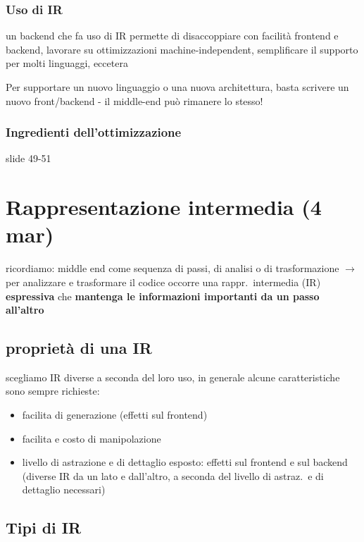 \subsubsection{Uso di IR}

un backend che fa uso di IR permette di disaccoppiare con facilit\`a frontend e backend, lavorare su ottimizzazioni machine-independent, semplificare il supporto per molti linguaggi, eccetera

\begin{emphasize}
  Per supportare un nuovo linguaggio o una nuova architettura, basta scrivere un nuovo front/backend - il middle-end pu\`o rimanere lo stesso!
\end{emphasize}

\subsubsection{Ingredienti dell'ottimizzazione}

slide 49-51

\section{Rappresentazione intermedia (4 mar)}

ricordiamo: middle end come sequenza di passi, di analisi o di trasformazione $\rightarrow$ per analizzare e trasformare il codice occorre una rappr.~intermedia (IR) \textbf{espressiva} che \textbf{mantenga le informazioni importanti da un passo all'altro}

\subsection{propriet\`a di una IR}

scegliamo IR diverse a seconda del loro uso, in generale alcune caratteristiche sono sempre richieste:
\begin{itemize}
  \item facilita di generazione (effetti sul frontend)
  \item facilita e costo di manipolazione
  \item livello di astrazione e di dettaglio esposto: effetti sul frontend e sul backend (diverse IR da un lato e dall'altro, a seconda del livello di astraz.~e di dettaglio necessari)
\end{itemize}

\subsection{Tipi di IR}

